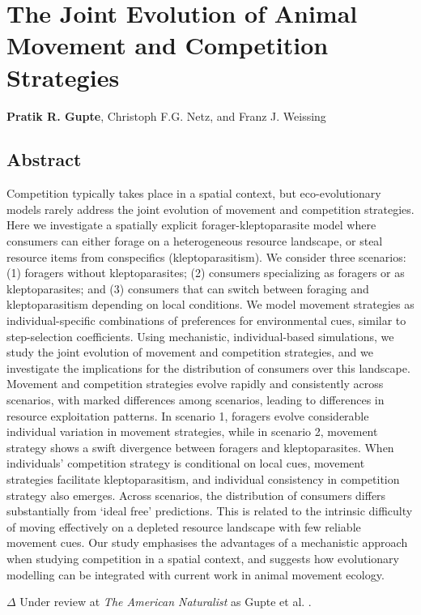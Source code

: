 
\chapter{The Joint Evolution of Animal Movement and Competition Strategies}\label{ch:kleptomove}

{\noindent \textbf{Pratik R. Gupte}, Christoph F.G. Netz, and Franz J. Weissing}

\section*{Abstract}

{
    \small
    Competition typically takes place in a spatial context, but eco-evolutionary models rarely address the joint evolution of movement and competition strategies.
    Here we investigate a spatially explicit forager-kleptoparasite model where consumers can either forage on a heterogeneous resource landscape, or steal resource items from conspecifics (kleptoparasitism). We consider three scenarios: (1) foragers without kleptoparasites; (2) consumers specializing as foragers or as kleptoparasites; and (3) consumers that can switch between foraging and kleptoparasitism depending on local conditions.
    We model movement strategies as individual-specific combinations of preferences for environmental cues, similar to step-selection coefficients.
    Using mechanistic, individual-based simulations, we study the joint evolution of movement and competition strategies, and we investigate the implications for the distribution of consumers over this landscape.
    Movement and competition strategies evolve rapidly and consistently across scenarios, with marked differences among scenarios, leading to differences in resource exploitation patterns.
    In scenario 1, foragers evolve considerable individual variation in movement strategies, while in scenario 2, movement strategy shows a swift divergence between foragers and kleptoparasites.
    When individuals' competition strategy is conditional on local cues, movement strategies facilitate kleptoparasitism, and individual consistency in competition strategy also emerges.
    Across scenarios, the distribution of consumers differs substantially from `ideal free' predictions.
    This is related to the intrinsic difficulty of moving effectively on a depleted resource landscape with few reliable movement cues.
    Our study emphasises the advantages of a mechanistic approach when studying competition in a spatial context, and suggests how evolutionary modelling can be integrated with current work in animal movement ecology.

    \bigskip

    {\noindent \large{$\Delta$}} Under review at \textit{The American Naturalist} as Gupte et al. .
}

